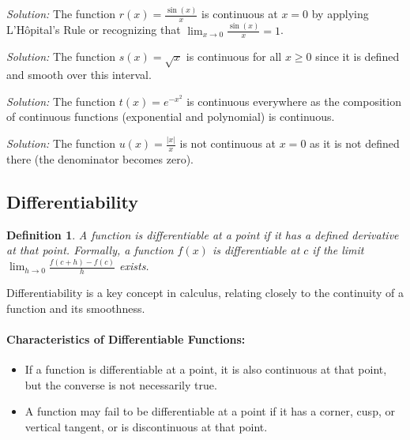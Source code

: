 \documentclass[a4paper,12pt]{book}
\newenvironment{solution}[1][]
{\par\noindent\textit{Solution:} \rmfamily}{\medskip}
\newtheorem{definition}{Definition}
\begin{document}
\begin{solution}[7]
The function \( r(x) = \frac{\sin(x)}{x} \) is continuous at \( x = 0 \) by applying L'Hôpital's Rule or recognizing that \( \lim_{x \to 0} \frac{\sin(x)}{x} = 1 \).
\end{solution}

\begin{solution}[8]
The function \( s(x) = \sqrt{x} \) is continuous for all \( x \geq 0 \) since it is defined and smooth over this interval.
\end{solution}

\begin{solution}[9]
The function \( t(x) = e^{-x^2} \) is continuous everywhere as the composition of continuous functions (exponential and polynomial) is continuous.
\end{solution}

\begin{solution}[10]
The function \( u(x) = \frac{|x|}{x} \) is not continuous at \( x = 0 \) as it is not defined there (the denominator becomes zero).
\end{solution}

\subsection{Differentiability}
\begin{definition}
A function is differentiable at a point if it has a defined derivative at that point. Formally, a function \( f(x) \) is differentiable at \( c \) if the limit \(\lim_{h \to 0} \frac{f(c + h) - f(c)}{h}\) exists.
\end{definition}

Differentiability is a key concept in calculus, relating closely to the continuity of a function and its smoothness.

\paragraph{Characteristics of Differentiable Functions:}
\begin{itemize}
    \item If a function is differentiable at a point, it is also continuous at that point, but the converse is not necessarily true.
    \item A function may fail to be differentiable at a point if it has a corner, cusp, or vertical tangent, or is discontinuous at that point.
\end{itemize}
\end{document}
